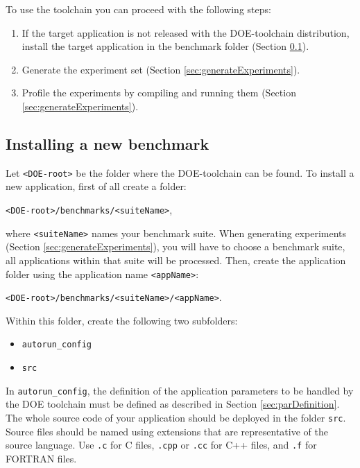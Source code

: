 \documentclass[a4paper, 10pt]{article}
\begin{document}
To use the toolchain you can proceed with the following steps:
\begin{enumerate}
 \item If the target application is not released with the DOE-toolchain distribution,
	install the target application in the benchmark folder (Section \ref{sec:installApp}).
 \item Generate the experiment set (Section \ref{sec:generateExperiments}).
 \item Profile the experiments by compiling and running them (Section \ref{sec:generateExperiments}).
\end{enumerate}

\subsection{Installing a new benchmark}
\label{sec:installApp}

Let \verb!<DOE-root>! be the folder where the DOE-toolchain can be found.
To install a new application, first of all create a folder:

\verb!<DOE-root>/benchmarks/<suiteName>!, 

where \verb!<suiteName>! names your benchmark suite.
When generating experiments (Section \ref{sec:generateExperiments}),
you will have to choose a benchmark suite, all applications within that suite will be processed.
Then, create the application folder using the application name \verb!<appName>!:

\verb!<DOE-root>/benchmarks/<suiteName>/<appName>!.

Within this folder, create the following two subfolders:
\begin{itemize}
 \item \verb!autorun_config!
 \item \verb!src!
\end{itemize}

In \verb!autorun_config!, the definition of the application parameters to be handled by the DOE toolchain must
be defined as described in Section \ref{sec:parDefinition}. The whole source code of your application should be deployed
in the folder \verb!src!. Source files should be named using extensions that are representative
of the source language. Use \verb!.c! for C files, \verb!.cpp! or \verb!.cc! for C++ files, and \verb!.f! for FORTRAN files.
\end{document}
